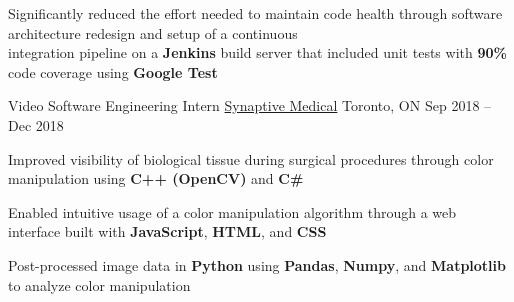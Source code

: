 \documentclass[]{awesome-cv}
\begin{document}
\begin{cventries}
{\begin{cvitems}
		\item {Significantly reduced the effort needed to maintain code health through software architecture redesign and setup of a continuous \\integration pipeline on a \textbf{Jenkins} build server that included unit tests with \textbf{90\%} code coverage using \textbf{Google Test}}
		\end{cvitems}}
	\cventry
	{Video Software Engineering Intern}
	{\href{https://www.synaptivemedical.com/}{Synaptive Medical}}
	{Toronto, ON}
	{Sep 2018 – Dec 2018}
	{\begin{cvitems}
		\item {Improved visibility of biological tissue during surgical procedures through color manipulation using \textbf{C++ (OpenCV)} and \textbf{C\#}}
		\item {Enabled intuitive usage of a color manipulation algorithm through a web interface built with \textbf{JavaScript}, \textbf{HTML}, and \textbf{CSS}}
		\item {Post-processed image data in \textbf{Python} using \textbf{Pandas}, \textbf{Numpy}, and \textbf{Matplotlib} to analyze color manipulation}
		\end{cvitems}}
\end{cventries}
\end{document}

